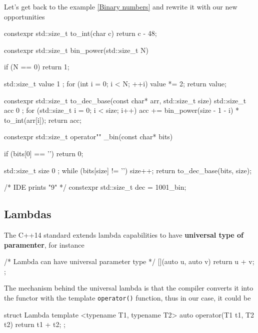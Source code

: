 \documentclass[../main]{subfiles}
\begin{document}
    Let's get back to the example \ref{Binary numbers} and rewrite it with our new opportunities
\begin{Code}
    constexpr std::size_t to_int(char c)
    {
        return c - 48;
    }
    
    constexpr std::size_t bin_power(std::size_t N)
    {
        if (N == 0)
        {
            return 1;
        }
        
        std::size_t value { 1 };
        for (int i = 0; i < N; ++i)
        {
            value *= 2;
        }
        return value;
    }
    
    constexpr std::size_t to_dec_base(const char* arr, std::size_t size)
    {
        std::size_t acc { 0 };
        for (std::size_t i = 0; i < size; i++)
        {
            acc += bin_power(size - 1 - i) * to_int(arr[i]);
        }
        return acc;
    }
    
    constexpr std::size_t operator"" _bin(const char* bits)
    {
        if (bits[0] == '\0')
        {
            return 0;
        }
        
        std::size_t size { 0 };
        while (bits[size] != '\0')
        {
            size++;
        }
        return to_dec_base(bits, size);
    }

    /* IDE prints "9" */
    constexpr std::size_t dec = 1001_bin;
\end{Code}

\subsection {Lambdas}
    The C++14 standard extends lambda capabilities to have \textbf{universal type of paramenter}, for instance
\begin{Code}
    /* Lambda can have universal parameter type */
    [](auto u, auto v) { return u + v; };
\end{Code}
\noindent
The mechanism behind the universal lambda is that the compiler converts it into the functor with the template \texttt{operator()} function, thus
in our case, it could be
\begin{Code}
    struct Lambda
    {
        template <typename T1, typename T2>
        auto operator(T1 t1, T2 t2) { return t1 + t2; }
    };
\end{Code}
\end{document}
